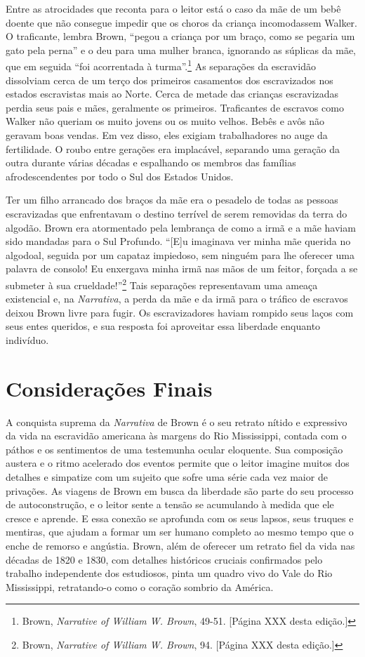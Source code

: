 Entre as atrocidades que reconta para o leitor está o caso da mãe de um
bebê doente que não consegue impedir que os choros da criança
incomodassem Walker. O traficante, lembra Brown, ``pegou a criança por
um braço, como se pegaria um gato pela perna'' e o deu para uma mulher
branca, ignorando as súplicas da mãe, que em seguida ``foi acorrentada à
turma''.\footnote{Brown, \emph{Narrative of William W. Brown}, 49-51.
  {[}Página XXX desta edição.{]}} As separações da escravidão dissolviam
cerca de um terço dos primeiros casamentos dos escravizados nos estados
escravistas mais ao Norte. Cerca de metade das crianças escravizadas
perdia seus pais e mães, geralmente os primeiros. Traficantes de
escravos como Walker não queriam os muito jovens ou os muito velhos.
Bebês e avôs não geravam boas vendas. Em vez disso, eles exigiam
trabalhadores no auge da fertilidade. O roubo entre gerações era
implacável, separando uma geração da outra durante várias décadas e
espalhando os membros das famílias afrodescendentes por todo o Sul dos
Estados Unidos.

Ter um filho arrancado dos braços da mãe era o pesadelo de todas as
pessoas escravizadas que enfrentavam o destino terrível de serem
removidas da terra do algodão. Brown era atormentado pela lembrança de
como a irmã e a mãe haviam sido mandadas para o Sul Profundo. ``{[}E{]}u
imaginava ver minha mãe querida no algodoal, seguida por um capataz
impiedoso, sem ninguém para lhe oferecer uma palavra de consolo! Eu
enxergava minha irmã nas mãos de um feitor, forçada a se submeter à sua
crueldade!''\footnote{Brown, \emph{Narrative of William W. Brown}, 94.
  {[}Página XXX desta edição.{]}} Tais separações representavam uma
ameaça existencial e, na \emph{Narrativa}, a perda da mãe e da irmã para
o tráfico de escravos deixou Brown livre para fugir. Os escravizadores
haviam rompido seus laços com seus entes queridos, e sua resposta foi
aproveitar essa liberdade enquanto indivíduo.

\section{Considerações Finais}

A conquista suprema da \emph{Narrativa} de Brown é o seu retrato nítido
e expressivo da vida na escravidão americana às margens do Rio
Mississippi, contada com o páthos e os sentimentos de uma testemunha
ocular eloquente. Sua composição austera e o ritmo acelerado dos eventos
permite que o leitor imagine muitos dos detalhes e simpatize com um
sujeito que sofre uma série cada vez maior de privações. As viagens de
Brown em busca da liberdade são parte do seu processo de autoconstrução,
e o leitor sente a tensão se acumulando à medida que ele cresce e
aprende. E essa conexão se aprofunda com os seus lapsos, seus truques e
mentiras, que ajudam a formar um ser humano completo ao mesmo tempo que
o enche de remorso e angústia. Brown, além de oferecer um retrato fiel
da vida nas décadas de 1820 e 1830, com detalhes históricos cruciais
confirmados pelo trabalho independente dos estudiosos, pinta um quadro
vivo do Vale do Rio Mississippi, retratando-o como o coração sombrio da
América.
